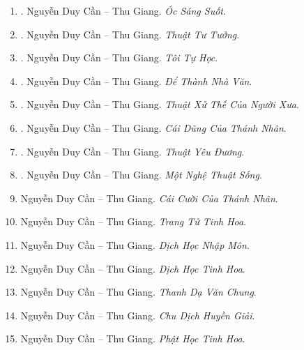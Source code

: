 \documentclass{article}
\begin{document}
\begin{enumerate}
	\item \cite{Can_oc_sang_suot}. {\sc Nguyễn Duy Cần -- Thu Giang}. {\it Óc Sáng Suốt}.\hfill{\sf[done]}
	
	\item \cite{Can_thuat_tu_tuong}. {\sc Nguyễn Duy Cần -- Thu Giang}. {\it Thuật Tư Tưởng}.\hfill{\sf[done]}
	
	\item \cite{Can_tu_hoc}. {\sc Nguyễn Duy Cần -- Thu Giang}. {\it Tôi Tự Học}.\hfill{\sf[done]}
	
	\item \cite{Can_nha_van}. {\sc Nguyễn Duy Cần -- Thu Giang}. {\it Để Thành Nhà Văn}.\hfill{\sf[done]}
	
	\item \cite{Can_thuat_xu_the}. 	{\sc Nguyễn Duy Cần -- Thu Giang}. {\it Thuật Xử Thế Của Người Xưa}.\hfill{\sf[done]}
	
	\item \cite{Can_dung_thanh_nhan}. {\sc Nguyễn Duy Cần -- Thu Giang}. {\it Cái Dũng Của Thánh Nhân}.\hfill{\sf[done]}
	
	\item \cite{Can_thuat_yeu_duong}. {\sc Nguyễn Duy Cần -- Thu Giang}. {\it Thuật Yêu Đương}.\hfill{\sf[done]}
	
	\item \cite{Can_nghe_thuat_song}. {\sc Nguyễn Duy Cần -- Thu Giang}. {\it Một Nghệ Thuật Sống}.\hfill{\sf[done]}
	
	\item {\sc Nguyễn Duy Cần -- Thu Giang}. {\it Cái Cười Của Thánh Nhân}.
	
	\item {\sc Nguyễn Duy Cần -- Thu Giang}. {\it Trang Tử Tinh Hoa}.
	
	\item {\sc Nguyễn Duy Cần -- Thu Giang}. {\it Dịch Học Nhập Môn}.
	
	\item {\sc Nguyễn Duy Cần -- Thu Giang}. {\it Dịch Học Tinh Hoa}.
	
	\item {\sc Nguyễn Duy Cần -- Thu Giang}. {\it Thanh Dạ Văn Chung}.

	\item {\sc Nguyễn Duy Cần -- Thu Giang}. {\it Chu Dịch Huyền Giải}.
	
	\item {\sc Nguyễn Duy Cần -- Thu Giang}. {\it Phật Học Tinh Hoa}.
	

\end{enumerate}
\end{document}
